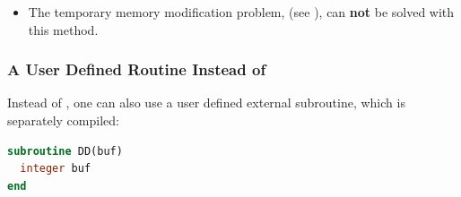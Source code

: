 \begin{itemize}
\begin{example}
Solution for the Fortran register optimization problems with one-sided communication in Example~\ref{ex:1sided-register}.
\label{exa:lang:fence:sync}
%
\begin{Verbatim}[commandchars=\\\{\}]
\wideunderline\rlap{\textbf{Source of Process 1}}                              \textbf{Source of Process 2}
bbbb = 777                    buff = 999
                              call MPI_F_SYNC_REG(buff)
call MPI_WIN_FENCE            call MPI_WIN_FENCE
call MPI_PUT(bbbb
into buff of process 2)

call MPI_WIN_FENCE            call MPI_WIN_FENCE
call MPI_F_SYNC_REG(bbbb)     call MPI_F_SYNC_REG(buff)
                              ccc = buff
\end{Verbatim}
\lstset{fancyvrb=false}
\end{example}

\item The temporary memory modification problem, (see
      ),
      can \textbf{not} be solved with this method.
\end{itemize}

\subsubsection{A User Defined Routine Instead of \texorpdfstring{}{MPI\_F\_SYNC\_REG}}
\label{sec:f90-problems:code-movements:dd}

Instead of , one can also use a
user defined external subroutine, which is separately compiled:

\begin{lstlisting}[language=Fortran]
subroutine DD(buf)
  integer buf
end
\end{lstlisting}

